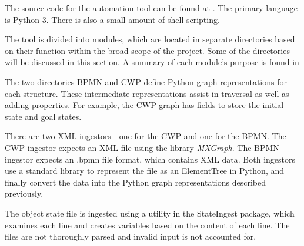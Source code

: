 The source code for the automation tool can be found at \cite{sourceCode}. The primary language is Python 3. There is also a small amount of shell scripting.

The tool is divided into modules, which are located in separate directories based on their function within the broad scope of the project. Some of the directories will be discussed in this section. A summary of each module's purpose is found in 

The two directories BPMN and CWP define Python graph representations for each structure. These intermediate representations assist in traversal as well as adding properties. For example, the CWP graph has fields to store the initial state and goal states.

There are two XML ingestors - one for the CWP and one for the BPMN. The CWP ingestor expects an XML file using the library \emph{MXGraph}. The BPMN ingestor expects an .bpmn file format, which contains XML data. Both ingestors use a standard library to represent the file as an ElementTree in Python, and finally convert the data into the Python graph representations described previously.

The object state file is ingested using a utility in the StateIngest package, which examines each line and creates variables based on the content of each line. The files are not thoroughly parsed and invalid input is not accounted for.
